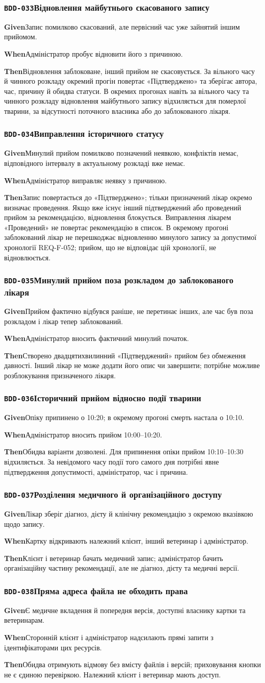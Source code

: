 \documentclass[11pt,a4paper]{article}
\newcommand{\scenario}[5]{%
  \Needspace{8\baselineskip}%
  \subsubsection*{\hypertarget{#1}{\texttt{#1}}\quad #2}%
  \textbf{Given}\quad #3\par
  \textbf{When}\quad #4\par
  \textbf{Then}\quad #5\par\medskip}
\begin{document}
\scenario{BDD-033}{Відновлення майбутнього скасованого запису}{Запис помилково скасований, але первісний час уже зайнятий іншим прийомом.}{Адміністратор пробує відновити його з причиною.}{Відновлення заблоковане, інший прийом не скасовується. За вільного часу й чинного розкладу окремий прогін повертає «Підтверджено» та зберігає автора, час, причину й обидва статуси. В окремих прогонах навіть за вільного часу та чинного розкладу відновлення майбутнього запису відхиляється для померлої тварини, за відсутності поточного власника або до заблокованого лікаря.}

\scenario{BDD-034}{Виправлення історичного статусу}{Минулий прийом помилково позначений неявкою, конфліктів немає, відповідного інтервалу в актуальному розкладі вже немає.}{Адміністратор виправляє неявку з причиною.}{Запис повертається до «Підтверджено»; тільки призначений лікар окремо визначає проведення. Якщо вже існує інший підтверджений або проведений прийом за рекомендацією, відновлення блокується. Виправлення лікарем «Проведений» не повертає рекомендацію в список. В окремому прогоні заблокований лікар не перешкоджає відновленню минулого запису за допустимої хронології REQ-F-052; прийом, що не відповідає цій хронології, не відновлюється.}

\scenario{BDD-035}{Минулий прийом поза розкладом до заблокованого лікаря}{Прийом фактично відбувся раніше, не перетинає інших, але час був поза розкладом і лікар тепер заблокований.}{Адміністратор вносить фактичний минулий початок.}{Створено двадцятихвилинний «Підтверджений» прийом без обмеження давності. Інший лікар не може додати його опис чи завершити; потрібне можливе розблокування призначеного лікаря.}

\scenario{BDD-036}{Історичний прийом відносно події тварини}{Опіку припинено о 10:20; в окремому прогоні смерть настала о 10:10.}{Адміністратор вносить прийом 10:00–10:20.}{Обидва варіанти дозволені. Для припинення опіки прийом 10:10–10:30 відхиляється. За невідомого часу події того самого дня потрібні явне підтвердження допустимості, адміністратор, час і причина.}

\scenario{BDD-037}{Розділення медичного й організаційного доступу}{Лікар зберіг діагноз, дієту й клінічну рекомендацію з окремою вказівкою щодо запису.}{Картку відкривають належний клієнт, інший ветеринар і адміністратор.}{Клієнт і ветеринар бачать медичний запис; адміністратор бачить організаційну частину рекомендації, але не діагноз, дієту та медичні версії.}

\scenario{BDD-038}{Пряма адреса файла не обходить права}{Є медичне вкладення й попередня версія, доступні власнику картки та ветеринарам.}{Сторонній клієнт і адміністратор надсилають прямі запити з ідентифікаторами цих ресурсів.}{Обидва отримують відмову без вмісту файлів і версій; приховування кнопки не є єдиною перевіркою. Належний клієнт і ветеринар мають доступ.}
\end{document}
